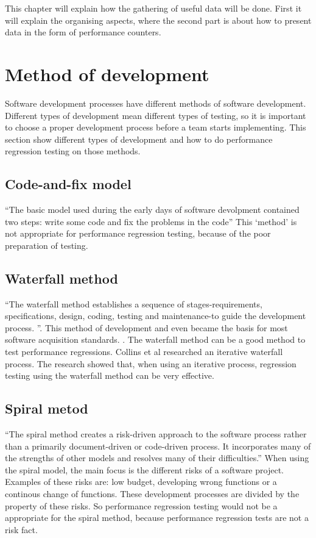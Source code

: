This chapter will explain how the gathering of useful data will be done. First it will explain the organising aspects, where the second part is about how to present data in the form of performance counters.
\section{Method of development}
Software development processes have different methods of software development. Different types of development mean different types of testing, so it is important to choose a proper development process before a team starts implementing. This section show different types of development and how to do performance regression testing on those methods.
\subsection{Code-and-fix model}
``The basic model used during the early days of software devolpment contained two steps: write some code and fix the problems in the code'' \cite{boehm1988spiral} This `method' is not appropriate for performance regression testing, because of the poor preparation of testing. 

\subsection{Waterfall method}
``The waterfall method establishes a sequence of stages-requirements, specifications, design, coding, testing and maintenance-to guide the development process. ''\cite{kang1989software}. This method of development and even became the basis for most software acquisition standards. \cite{boehm1988spiral}. The waterfall method can be a good method to test performance regressions. Collins et al researched an iterative waterfall process. \cite{collins2010iterative} The research showed that, when using an iterative process, regression testing using the waterfall method can be very effective. 
\subsection{Spiral metod}
``The spiral method creates a risk-driven approach to the software process rather than a primarily document-driven or code-driven process. It incorporates many of the strengths
of other models and resolves many of their
difficulties.''\cite{boehm1988spiral} When using the spiral model, the main focus is the different risks of a software project. Examples of these risks are: low budget, developing wrong functions or a continous change of functions. These development processes are divided by the property of these risks. So performance regression testing would not be a appropriate for the spiral method, because performance regression tests are not a risk fact.  

